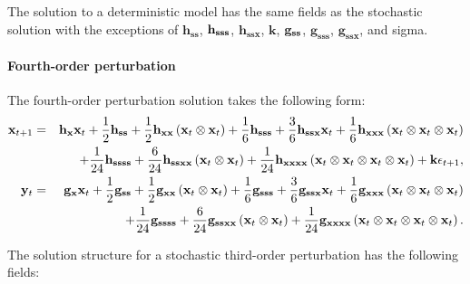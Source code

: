 \documentclass[notitlepage,11pt]{article}
\begin{document}
The solution to a deterministic model has the same fields as the stochastic
solution with the exceptions of $\mathbf{h}_{\mathbf{ss}}$, $\mathbf{h}_{%
\mathbf{sss}}$, $\mathbf{h}_{\mathbf{ssx}}$, $\mathbf{k}$, $\mathbf{g}_{%
\mathbf{ss}}$, $\mathbf{g}_{\mathbf{sss}}$, $\mathbf{g}_{\mathbf{ssx}}$, and
sigma.

\paragraph{Fourth-order perturbation}

The fourth-order perturbation solution takes the following form:%
\begin{eqnarray*}
\mathbf{x}_{t+1} &=&\mathbf{h}_{\mathbf{x}}\mathbf{x}_{t}+\frac{1}{2}\mathbf{%
h}_{\mathbf{ss}}+\frac{1}{2}\mathbf{h}_{\mathbf{xx}}\left( \mathbf{x}%
_{t}\otimes \mathbf{x}_{t}\right) +\frac{1}{6}\mathbf{h}_{\mathbf{sss}}+%
\frac{3}{6}\mathbf{h}_{\mathbf{ssx}}\mathbf{x}_{t}+\frac{1}{6}\mathbf{h}_{%
\mathbf{xxx}}\left( \mathbf{x}_{t}\otimes \mathbf{x}_{t}\otimes \mathbf{x}%
_{t}\right)  \\
&&+\frac{1}{24}\mathbf{h}_{\mathbf{ssss}}+\frac{6}{24}\mathbf{h}_{\mathbf{%
ssxx}}\left( \mathbf{x}_{t}\otimes \mathbf{x}_{t}\right) +\frac{1}{24}%
\mathbf{h}_{\mathbf{xxxx}}\left( \mathbf{x}_{t}\otimes \mathbf{x}_{t}\otimes 
\mathbf{x}_{t}\otimes \mathbf{x}_{t}\right) +\mathbf{k\epsilon }_{t+1}, \\
\mathbf{y}_{t} &=&\mathbf{g}_{\mathbf{x}}\mathbf{x}_{t}+\frac{1}{2}\mathbf{g}%
_{\mathbf{ss}}+\frac{1}{2}\mathbf{g}_{\mathbf{xx}}\left( \mathbf{x}%
_{t}\otimes \mathbf{x}_{t}\right) +\frac{1}{6}\mathbf{g}_{\mathbf{sss}}+%
\frac{3}{6}\mathbf{g}_{\mathbf{ssx}}\mathbf{x}_{t}+\frac{1}{6}\mathbf{g}_{%
\mathbf{xxx}}\left( \mathbf{x}_{t}\otimes \mathbf{x}_{t}\otimes \mathbf{x}%
_{t}\right)  \\
&&+\frac{1}{24}\mathbf{g}_{\mathbf{ssss}}+\frac{6}{24}\mathbf{g}_{\mathbf{%
ssxx}}\left( \mathbf{x}_{t}\otimes \mathbf{x}_{t}\right) +\frac{1}{24}%
\mathbf{g}_{\mathbf{xxxx}}\left( \mathbf{x}_{t}\otimes \mathbf{x}_{t}\otimes 
\mathbf{x}_{t}\otimes \mathbf{x}_{t}\right) .
\end{eqnarray*}

The solution structure for a stochastic third-order perturbation has the
following fields:
\end{document}

